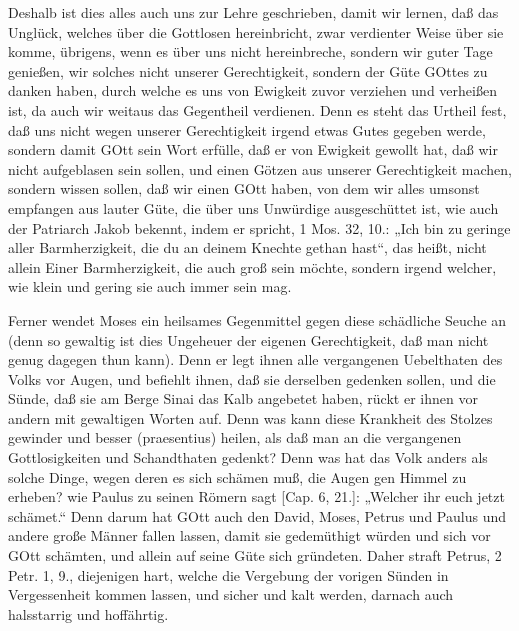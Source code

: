 Deshalb ist dies alles auch uns zur Lehre geschrieben, damit wir lernen, daß das Unglück, welches über die Gottlosen hereinbricht, zwar verdienter Weise über sie komme, übrigens, wenn es über uns nicht hereinbreche, sondern wir guter Tage genießen, wir solches nicht unserer Gerechtigkeit, sondern der Güte GOttes zu danken haben, durch welche es uns von Ewigkeit zuvor verziehen und verheißen ist, da auch wir weitaus das Gegentheil verdienen. Denn es steht das Urtheil fest, daß uns nicht wegen unserer Gerechtigkeit irgend etwas Gutes gegeben werde, sondern damit GOtt sein Wort erfülle, daß er von Ewigkeit gewollt hat, daß wir nicht aufgeblasen sein sollen, und einen Götzen aus unserer Gerechtigkeit machen, sondern wissen sollen, daß wir einen GOtt haben, von dem wir alles umsonst empfangen aus lauter Güte, die über uns Unwürdige ausgeschüttet ist, wie auch der Patriarch Jakob bekennt, indem er spricht, 1 Mos. 32, 10.: „Ich bin zu geringe aller Barmherzigkeit, die du an deinem Knechte gethan hast“, das heißt, nicht allein Einer Barmherzigkeit, die auch groß sein möchte, sondern irgend welcher, wie klein und gering sie auch immer sein mag.

Ferner wendet Moses ein heilsames Gegenmittel gegen diese schädliche Seuche an (denn so gewaltig ist dies Ungeheuer der eigenen Gerechtigkeit, daß man nicht genug dagegen thun kann). Denn er legt ihnen alle vergangenen Uebelthaten des Volks vor Augen, und befiehlt ihnen, daß sie derselben gedenken sollen, und die Sünde, daß sie am Berge Sinai das Kalb angebetet haben, rückt er ihnen vor andern mit gewaltigen Worten
auf. Denn was kann diese Krankheit des Stolzes gewinder und besser (praesentius) heilen, als daß man an die vergangenen Gottlosigkeiten und Schandthaten gedenkt? Denn was hat das Volk anders als solche Dinge, wegen deren es sich schämen muß, die Augen gen Himmel zu erheben? wie Paulus zu seinen Römern sagt [Cap. 6, 21.]: „Welcher ihr euch jetzt schämet.“ Denn darum hat GOtt auch den David, Moses, Petrus und Paulus und andere große Männer fallen lassen, damit sie gedemüthigt würden und sich vor GOtt schämten, und allein auf seine Güte sich gründeten. Daher straft Petrus, 2 Petr. 1, 9., diejenigen hart, welche die Vergebung der vorigen Sünden in Vergessenheit kommen lassen, und sicher und kalt werden, darnach auch halsstarrig und hoffährtig.

